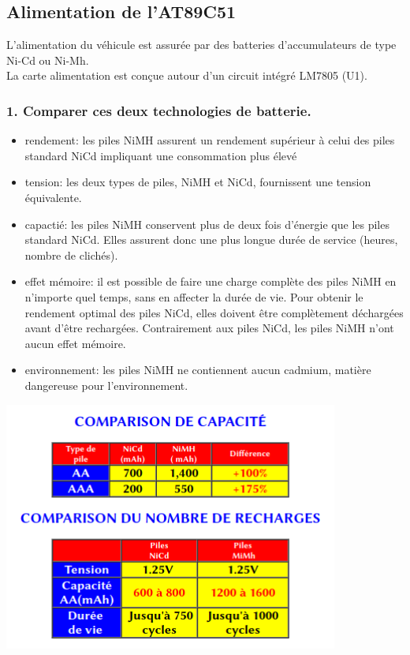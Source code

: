 \documentclass[french,a4paper,,tablecaptionabove]{scrartcl}
\begin{document}
\hypertarget{alimentation-de-lat89c51}{%
\subsection{Alimentation de l'AT89C51}\label{alimentation-de-lat89c51}}

L'alimentation du véhicule est assurée par des batteries d'accumulateurs
de type Ni-Cd ou Ni-Mh.\\
La carte alimentation est conçue autour d'un circuit intégré LM7805
(U1).

\hypertarget{comparer-ces-deux-technologies-de-batterie.}{%
\subsubsection{1. Comparer ces deux technologies de
batterie.}\label{comparer-ces-deux-technologies-de-batterie.}}

\begin{itemize}
\item
  rendement: les piles NiMH assurent un rendement supérieur à celui des
  piles standard NiCd impliquant une consommation plus élevé
\item
  tension: les deux types de piles, NiMH et NiCd, fournissent une
  tension équivalente.
\item
  capactié: les piles NiMH conservent plus de deux fois d'énergie que
  les piles standard NiCd. Elles assurent donc une plus longue durée de
  service (heures, nombre de clichés).
\item
  effet mémoire: il est possible de faire une charge complète des piles
  NiMH en n'importe quel temps, sans en affecter la durée de vie. Pour
  obtenir le rendement optimal des piles NiCd, elles doivent être
  complètement déchargées avant d'être rechargées. Contrairement aux
  piles NiCd, les piles NiMH n'ont aucun effet mémoire.
\item
  environnement: les piles NiMH ne contiennent aucun cadmium, matière
  dangereuse pour l'environnement.
\end{itemize}

\includegraphics[width=11cm,height=\textheight]{images/comp.png}
\end{document}
